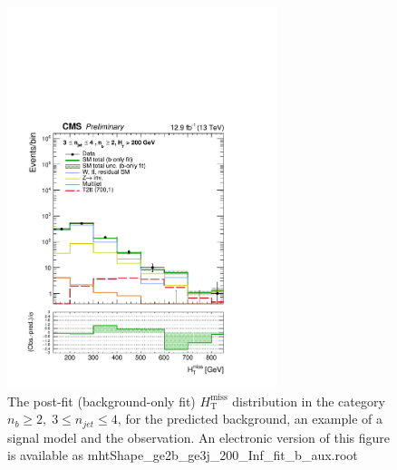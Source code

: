 \begin{figure}[tbhp]
    \caption{ 
    The post-fit (background-only fit) $H_{\mathrm{T}}^{\mathrm{miss}}$ distribution in the category $n_{b}\geq 2, \; 3 \leq n_{jet} \leq 4$, 
    for the predicted background, an example of a signal model and the observation.
    An electronic version of this figure is available as mhtShape\_ge2b\_ge3j\_200\_Inf\_fit\_b\_aux.root
    \label{fig:mhtShape_ge2b_ge3j_fit_b} }
  \begin{center}
  \includegraphics[width=0.7\textwidth]{mhtShape_ge2b_ge3j_200_Inf_fit_b_aux}
  \end{center}
\end{figure}


